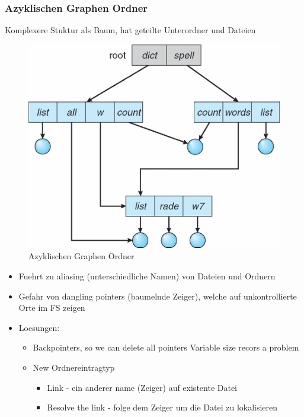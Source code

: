 \documentclass[a4paper]{scrreprt}
\begin{document}
\subsubsection{Azyklischen Graphen Ordner}
Komplexere Stuktur als Baum, hat geteilte Unterordner und Dateien

\begin{figure}[ht]
\centering
\includegraphics[scale=0.25]{graphics/acyclic_graph_directories.png}
\caption{Azyklischen Graphen Ordner}
\end{figure}

\begin{itemize}
	\item Fuehrt zu aliasing (unterschiedliche Namen) von Dateien und Ordnern
	\item Gefahr von dangling pointers (baumelnde Zeiger), welche auf unkontrollierte Orte im FS zeigen
	\item Loesungen:
		\begin{itemize}
			\item Backpointers, so we can delete all pointers Variable size recors a problem
			\item New Ordnereintragtyp
				\begin{itemize}
					\item Link - ein anderer name (Zeiger) auf existente Datei
					\item Resolve the link - folge dem Zeiger um die Datei zu lokalisieren
				\end{itemize}
		\end{itemize}
\end{itemize}
\end{document}
